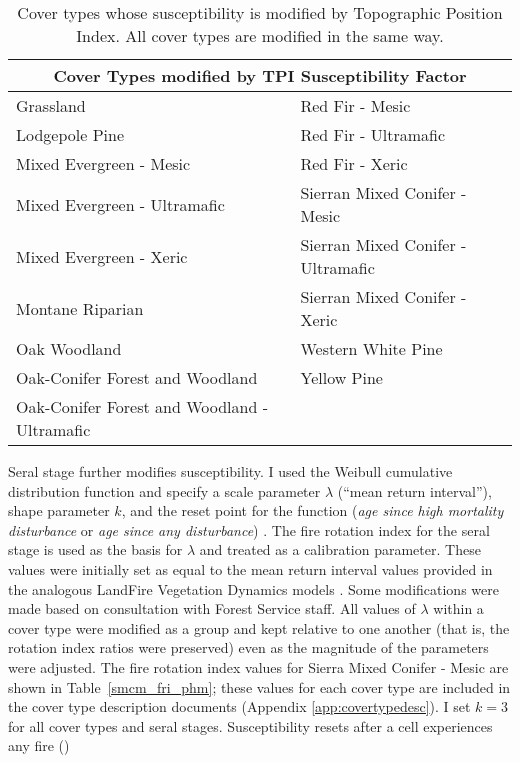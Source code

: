 \begin{itemize}
\begin{table}[htbp]
\footnotesize
\centering
\caption{Cover types whose susceptibility is modified by Topographic Position Index. All cover types are modified in the same way.}
\label{covtpi}
\begin{tabular}{ll}
\hline
\multicolumn{2}{c}{\textbf{Cover Types modified by TPI Susceptibility Factor}} \\
\hline
Grassland     					& Red Fir - Mesic   			\\
Lodgepole Pine    				& Red Fir - Ultramafic			\\
Mixed Evergreen - Mesic				& Red Fir - Xeric    			\\
Mixed Evergreen - Ultramafic     		& Sierran Mixed Conifer - Mesic    	\\
Mixed Evergreen - Xeric 			& Sierran Mixed Conifer - Ultramafic 	\\
Montane Riparian				& Sierran Mixed Conifer - Xeric 	\\
Oak Woodland 					& Western White Pine			\\
Oak-Conifer Forest and Woodland 		& Yellow Pine 				\\
Oak-Conifer Forest and Woodland - Ultramafic 	&					\\
\hline
\end{tabular}

\end{table}

Seral stage further modifies susceptibility. I used the Weibull cumulative distribution function and specify a scale parameter $\lambda$ (``mean return interval''), shape parameter $k$, and the reset point for the function (\emph{age since high mortality disturbance} or \emph{age since any disturbance}) \citep{Johnson1985}. The fire rotation index for the seral stage is used as the basis for $\lambda$ and treated as a calibration parameter. These values were initially set as equal to the mean return interval values provided in the analogous LandFire Vegetation Dynamics models \citep{Landfire2007}. Some modifications were made based on consultation with Forest Service staff. All values of $\lambda$ within a cover type were modified as a group and kept relative to one another (that is, the rotation index ratios were preserved) even as the magnitude of the parameters were adjusted. The fire rotation index values for Sierra Mixed Conifer - Mesic are shown in Table~\ref{smcm_fri_phm}; these values for each cover type are included in the cover type description documents (Appendix \ref{app:covertypedesc}). I set $k=3$ for all cover types and seral stages. Susceptibility resets after a cell experiences any fire ()



\end{itemize}
